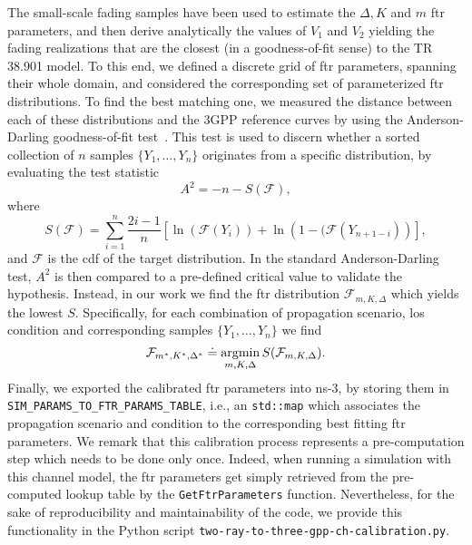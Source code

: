 The small-scale fading samples have been used to estimate the $\Delta, K$ and $m$ \gls{ftr} parameters, and then derive analytically the values of $V_1$ and $V_2$ yielding the fading realizations that are the closest (in a goodness-of-fit sense) to the TR 38.901 model.
To this end, we defined a discrete grid of \gls{ftr} parameters, spanning their whole domain, and considered the corresponding set of parameterized \gls{ftr} distributions. To find the best matching one, we measured the distance between each of these distributions and the 3GPP reference curves by using the Anderson-Darling goodness-of-fit test~\cite{anderson1954test}. This test is used to discern whether a sorted collection of $n$ samples $\{Y_{1}, \ldots, Y_n\}$ originates from a specific distribution, by evaluating the test statistic~\cite{anderson1954test}
\begin{equation}
    A^2 = -n -S(\mathcal{F}),
\end{equation}
where
\begin{equation}
    S(\mathcal{F}) = \sum _{i=1}^{n} \frac {2i-1}{n} \left[ \ln (\mathcal{F}(Y_{i}))+\ln \left(1-(\mathcal{F}(Y_{n+1-i})\right)\right], 
\end{equation}
and $\mathcal{F}$ is the \gls{cdf} of the target distribution.
In the standard Anderson-Darling test, $A^2$ is then compared to a pre-defined critical value to validate the hypothesis. Instead, in our work we find the \gls{ftr} distribution $\mathcal{F}_{m, K, \Delta}$ which yields the lowest $S$. 
Specifically, for each combination of propagation scenario, \gls{los} condition and corresponding samples $\{Y_{1}, \ldots, Y_n\}$ we find
\begin{equation}
    \mathcal{F}_{m^*, K^*, \Delta^*} \doteq \operatorname*{\arg\!\min}_{m, K, \Delta} S (\mathcal{F}_{m, K, \Delta}).
\end{equation}
%
Finally, we exported the calibrated \gls{ftr} parameters into ns-3, by storing them in \texttt{SIM\_\-PARAMS\_\-TO\_FTR\_\-PARAMS\_\-TABLE}, i.e., an \texttt{std::map} which associates the propagation scenario and condition to the corresponding best fitting \gls{ftr} parameters.
We remark that this calibration process represents a pre-computation step which needs to be done only once. Indeed, when running a simulation with this channel model, the \gls{ftr} parameters get simply retrieved from the pre-computed lookup table by the \texttt{Get\-Ftr\-Parameters} function. Nevertheless, for the sake of reproducibility and maintainability of the code, we provide this functionality in the Python script \texttt{two-\-ray-\-to-\-three-\-gpp-\-ch-\-calibration.py}.

